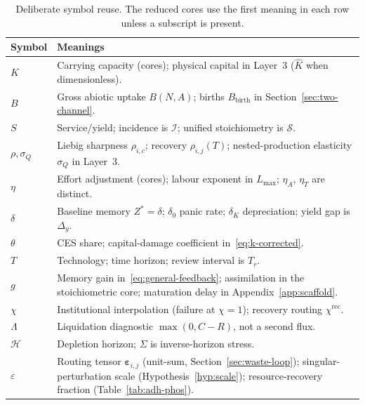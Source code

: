 \documentclass[11pt]{article}
\theoremstyle{definition}
\begin{document}
\begin{table}[h]
\centering\small
\caption{Deliberate symbol reuse. The reduced cores use the first meaning in each row unless a subscript is present.}
\label{tab:symbols}
\begin{tabular}{lp{10.2cm}}
\toprule
Symbol & Meanings \\
\midrule
$K$ & Carrying capacity (cores); physical capital in Layer~3 ($\hat K$ when dimensionless). \\
$B$ & Gross abiotic uptake $B(N,A)$; births $B_{\mathrm{birth}}$ in Section~\ref{sec:two-channel}. \\
$S$ & Service/yield; incidence is $\mathcal I$; unified stoichiometry is $\mathcal S$. \\
$\rho,\sigma_Q$ & Liebig sharpness $\rho_{i,c}$; recovery $\rho_{i,j}(T)$; nested-production elasticity $\sigma_Q$ in Layer~3. \\
$\eta$ & Effort adjustment (cores); labour exponent in $L_{\max}$; $\eta_A$, $\eta_T$ are distinct. \\
$\delta$ & Baseline memory $Z^*=\delta$; $\delta_0$ panic rate; $\delta_K$ depreciation; yield gap is $\Delta_y$. \\
$\theta$ & CES share; capital-damage coefficient in~\eqref{eq:k-corrected}. \\
$T$ & Technology; time horizon; review interval is $T_r$. \\
$g$ & Memory gain in~\eqref{eq:general-feedback}; assimilation in the stoichiometric core; maturation delay in Appendix~\ref{app:scaffold}. \\
$\chi$ & Institutional interpolation (failure at $\chi=1$); recovery routing $\chi^{\mathrm{rec}}$. \\
$\Lambda$ & Liquidation diagnostic $\max(0,C-R)$, not a second flux. \\
$\mathcal H$ & Depletion horizon; $\Sigma$ is inverse-horizon stress. \\
$\varepsilon$ & Routing tensor $\boldsymbol\varepsilon_{i,j}$ (unit-sum, Section~\ref{sec:waste-loop}); singular-perturbation scale (Hypothesis~\ref{hyp:scale}); resource-recovery fraction (Table~\ref{tab:adh-phos}). \\
\bottomrule
\end{tabular}
\end{table}
\end{document}

